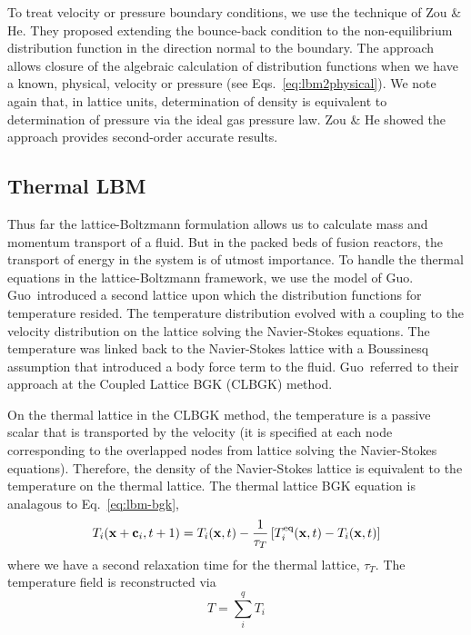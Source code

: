 To treat velocity or pressure boundary conditions, we use the technique of Zou \& He.\cite{Zou1997} They proposed extending the bounce-back condition to the non-equilibrium distribution function in the direction normal to the boundary. The approach allows closure of the algebraic calculation of distribution functions when we have a known, physical, velocity or pressure (see Eqs.~\ref{eq:lbm2physical}). We note again that, in lattice units, determination of density is equivalent to determination of pressure via the ideal gas pressure law. Zou \& He showed the approach provides second-order accurate results.\cite{Zou1997} 












\subsection{Thermal LBM}

Thus far the lattice-Boltzmann formulation allows us to calculate mass and momentum transport of a fluid. But in the packed beds of fusion reactors, the transport of energy in the system is of utmost importance. To handle the thermal equations in the lattice-Boltzmann framework, we use the model of Guo\etal.\cite{Guo2002} Guo\etal~introduced a second lattice upon which the distribution functions for temperature resided. The temperature distribution evolved with a coupling to the velocity distribution on the lattice solving the Navier-Stokes equations. The temperature was linked back to the Navier-Stokes lattice with a Boussinesq assumption that introduced a body force term to the fluid.\cite{Guo2002} Guo\etal~referred to their approach at the Coupled Lattice BGK (CLBGK) method. 

On the thermal lattice in the CLBGK method, the temperature is a passive scalar that is transported by the velocity (it is specified at each node corresponding to the overlapped nodes from lattice solving the Navier-Stokes equations). Therefore, the density of the Navier-Stokes lattice is equivalent to the temperature on the thermal lattice. The thermal lattice BGK equation is analagous to Eq.~\ref{eq:lbm-bgk},
\begin{equation}\label{eq:lbm-thermal-bgk}
	T_i(\mathbf{x}+\mathbf{c}_i, t + 1) = T_i(\mathbf{x},t) - \frac{1}{\tau_T}\left[T_i^{\text{eq}}(\mathbf{x},t) - T_i(\mathbf{x},t)\right]
\end{equation}
where we have a second relaxation time for the thermal lattice, $\tau_T$. The temperature field is reconstructed via
\begin{equation}
	T = \sum_i^q T_i
\end{equation}


